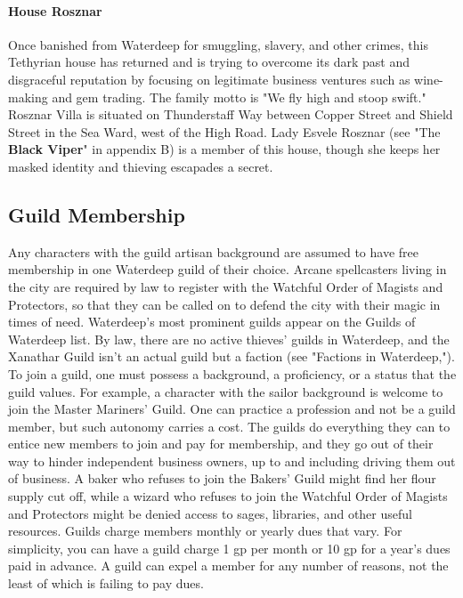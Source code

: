 \documentclass[10pt,a4paper,twoside,twocolumn,openany,nodeprecatedcode]{dndbook}
\begin{document}
\paragraph{House Rosznar}
Once banished from Waterdeep for smuggling, slavery, and other crimes, this Tethyrian house has returned and is trying to overcome its dark past and disgraceful reputation by focusing on legitimate business ventures such as wine-making and gem trading. The family motto is "We fly high and stoop swift." Rosznar Villa is situated on Thunderstaff Way between Copper Street and Shield Street in the Sea Ward, west of the High Road.
Lady Esvele Rosznar (see "The \textbf{Black Viper}" in appendix B) is a member of this house, though she keeps her masked identity and thieving escapades a secret.
\subsection{Guild Membership}
Any characters with the guild artisan background are assumed to have free membership in one Waterdeep guild of their choice. Arcane spellcasters living in the city are required by law to register with the Watchful Order of Magists and Protectors, so that they can be called on to defend the city with their magic in times of need.
Waterdeep's most prominent guilds appear on the Guilds of Waterdeep list. By law, there are no active thieves' guilds in Waterdeep, and the Xanathar Guild isn't an actual guild but a faction (see "Factions in Waterdeep,").
To join a guild, one must possess a background, a proficiency, or a status that the guild values. For example, a character with the sailor background is welcome to join the Master Mariners' Guild. One can practice a profession and not be a guild member, but such autonomy carries a cost. The guilds do everything they can to entice new members to join and pay for membership, and they go out of their way to hinder independent business owners, up to and including driving them out of business. A baker who refuses to join the Bakers' Guild might find her flour supply cut off, while a wizard who refuses to join the Watchful Order of Magists and Protectors might be denied access to sages, libraries, and other useful resources.
Guilds charge members monthly or yearly dues that vary. For simplicity, you can have a guild charge 1 gp per month or 10 gp for a year's dues paid in advance. A guild can expel a member for any number of reasons, not the least of which is failing to pay dues.
\end{document}
